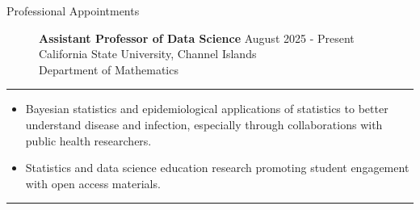 \documentclass{article}
\begin{document}
	\begin{description}
		\vspace{-2mm}
		\item[Professional Appointments]\hspace*{.1in}
		
		\textbf{Assistant Professor of Data Science} \hfill{August 2025 - Present} \\
		California State University, Channel Islands\\
		Department of Mathematics	
		\vspace*{1mm}
		
	\end{description}
	\vspace{-2mm}
	\rule{\linewidth}{1pt}
	
	
	
	\begin{description}
		\vspace{-2mm}
		\item[Research Interests]\hspace*{.1in}
		
		\begin{itemize}
			\item Bayesian statistics and epidemiological applications of statistics to better understand disease and infection, especially through collaborations with public health researchers.
			\item Statistics and data science education research promoting student engagement with open access materials. 
		\end{itemize}
	\end{description}
	
	\vspace{-2mm}
	\rule{\linewidth}{1pt}
	
	
	
\end{document}
